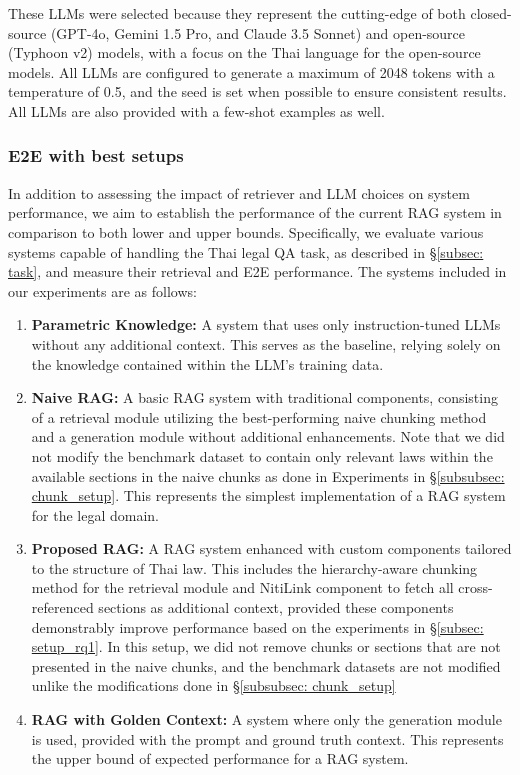 These LLMs were selected because they represent the cutting-edge of both closed-source (GPT-4o, Gemini 1.5 Pro, and Claude 3.5 Sonnet) and open-source (Typhoon v2) models, with a focus on the Thai language for the open-source models. 
%
All LLMs are configured to generate a maximum of 2048 tokens with a temperature of 0.5, and the seed is set when possible to ensure consistent results. 
%
All LLMs are also provided with a few-shot examples as well.



\subsubsection{E2E with best setups}
\label{subsubsec: e2e_best_setup}
In addition to assessing the impact of retriever and LLM choices on system performance, we aim to establish the performance of the current RAG system in comparison to both lower and upper bounds. 
%
Specifically, we evaluate various systems capable of handling the Thai legal QA task, as described in \S\ref{subsec: task}, and measure their retrieval and E2E performance. 
%
The systems included in our experiments are as follows:

\begin{enumerate}
    \item \textbf{Parametric Knowledge: } A system that uses only instruction-tuned LLMs without any additional context. 
    This serves as the baseline, relying solely on the knowledge contained within the LLM’s training data.
    \item \textbf{Naive RAG: } A basic RAG system with traditional components, consisting of a retrieval module utilizing the best-performing naive chunking method and a generation module without additional enhancements. Note that we did not modify the benchmark dataset to contain only relevant laws within the available sections in the naive chunks as done in Experiments in \S\ref{subsubsec: chunk_setup}. 
    This represents the simplest implementation of a RAG system for the legal domain.
    \item \textbf{Proposed RAG: } A RAG system enhanced with custom components tailored to the structure of Thai law. 
    This includes the hierarchy-aware chunking method for the retrieval module and NitiLink component to fetch all cross-referenced sections as additional context, provided these components demonstrably improve performance based on the experiments in \S\ref{subsec: setup_rq1}. In this setup, we did not remove chunks or sections that are not presented in the naive chunks, and the benchmark datasets are not modified unlike the modifications done in \S\ref{subsubsec: chunk_setup}
    \item \textbf{RAG with Golden Context: } A system where only the generation module is used, provided with the prompt and ground truth context. 
    This represents the upper bound of expected performance for a RAG system.
\end{enumerate}

